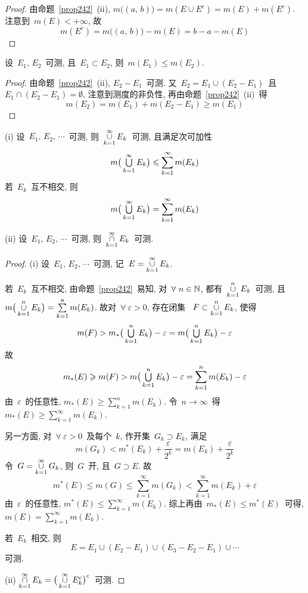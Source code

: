 \begin{proof}
由命题~\ref{prop242}~(ii), $m\big( (a,\,b) \big) = m(E \cup E^c) = m(E) + m(E^c)$.
注意到~$m(E) < +\infty$, 故
\[
m(E^c) = m\big( (a,\,b) \big) - m(E) = b-a - m(E)
\]
\end{proof}

\begin{proposition}[单调性]
设~$E_1,\,E_2$~可测, 且~$E_1 \subset E_2$, 则~$m(E_1) \leqslant m(E_2)$.
\end{proposition}

\begin{proof}
由命题~\ref{prop242}~(ii), $E_2 - E_1$~可测. 又~$E_2 = E_1 \cup (E_2 - E_1)$~且
~$E_1 \cap (E_2 - E_1) = \emptyset$, 注意到测度的非负性, 再由命题~\ref{prop242}~(ii)~得
\[
m(E_2) = m(E_1) + m(E_2 - E_1) \geqslant m(E_1)
\]
\end{proof}

\begin{proposition}[集运算封闭性Ⅱ] \label{prop244}

(i) 设~$E_1,\,E_2,\,\cdots$~可测, 则~$\mathop{\cup}\limits_{k=1}^\infty
E_k$~可测, 且满足次可加性
\[
m\big( \mathop{\textstyle{\bigcup}}_{k=1}^\infty E_k \big) \leqslant \sum_{k=1}^\infty m(E_k)
\]
若~$E_k$~互不相交, 则
\[
m\big( \mathop{\textstyle{\bigcup}}_{k=1}^\infty E_k \big) = \sum_{k=1}^\infty m(E_k)
\]

(ii) 设~$E_1,\,E_2,\,\cdots$~可测, 则~$\mathop{\cap}\limits_{k=1}^{\infty}E_k$~可测.
\end{proposition}

\begin{proof}
(i) 设~$E_1,\,E_2,\,\cdots$~可测, 记~$E = \mathop{\cup}\limits_{k=1}^\infty E_k$.

若~$E_k$~互不相交, 由命题~\ref{prop242}~易知, 对~$\forall~n \in \mathbb{N}$,
都有~$\mathop{\cup}\limits_{k=1}^n E_k$~可测, 且~$m\big( \mathop{\cup}\limits_{k=1}^n E_k \big)
= \sum\limits_{k=1}^n m(E_k)$. 故对~$\forall~\varepsilon > 0$, 存在闭集
~$F \subset \mathop{\cup}\limits_{k=1}^n E_k$, 使得
\[
m(F) > m_*\big( \mathop{\textstyle{\bigcup}}\limits_{k=1}^n E_k \big) - \varepsilon = m\big( \mathop{\textstyle{\bigcup}}\limits_{k=1}^n E_k \big) - \varepsilon
\]
故
\[
m_*(E) \geqslant m(F) > m\big( \mathop{\textstyle{\bigcup}}_{k=1}^n E_k \big) - \varepsilon =
\sum_{k=1}^n m(E_k) - \varepsilon
\]
由~$\varepsilon$~的任意性, $m_*(E) \geqslant \sum\limits_{k=1}^n m(E_k)$. 令~$n \to \infty$~得
~$m_*(E) \geqslant \sum\limits_{k=1}^\infty m(E_k)$.

另一方面, 对~$\forall~\varepsilon > 0$~及每个~$k$, 作开集~$G_k \supset E_k$, 满足
\[
m(G_k) < m^*(E_k) + \frac{\varepsilon}{2^k} = m(E_k) + \frac{\varepsilon}{2^k}
\]
令~$G = \mathop{\cup}\limits_{k=1}^\infty G_k$, 则~$G$~开, 且~$G \supset E$. 故
\[
m^*(E) \leqslant m(G) \leqslant \sum_{k=1}^\infty m(G_k) < \sum_{k=1}^\infty m(E_k)
+ \varepsilon
\]
由~$\varepsilon$~的任意性, $m^*(E) \leqslant \sum\limits_{k=1}^\infty m(E_k)$.
综上再由~$m_*(E) \leqslant m^*(E)$~可得, $m(E) = \sum\limits_{k=1}^\infty m(E_k)$.

若~$E_k$~相交, 则
\[
E = E_1 \cup (E_2 - E_1) \cup (E_3 - E_2 - E_1) \cup \cdots
\]
可测.

(ii) $\mathop{\cap}\limits_{k=1}^\infty E_k = \big( \mathop{\cup}\limits_{k=1}^\infty
E_k^c \big)^c$~可测.
\end{proof}

